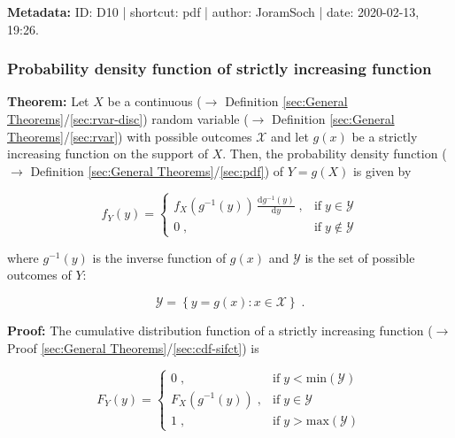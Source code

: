 \documentclass[a4paper,12pt,twoside]{book}
\begin{document}
\vspace{1em}
\textbf{Metadata:} ID: D10 | shortcut: pdf | author: JoramSoch | date: 2020-02-13, 19:26.
\vspace{1em}



\subsubsection[\textbf{Probability density function of strictly increasing function}]{Probability density function of strictly increasing function} \label{sec:pdf-sifct}
\setcounter{equation}{0}

\textbf{Theorem:} Let $X$ be a continuous ($\rightarrow$ Definition \ref{sec:General Theorems}/\ref{sec:rvar-disc}) random variable ($\rightarrow$ Definition \ref{sec:General Theorems}/\ref{sec:rvar}) with possible outcomes $\mathcal{X}$ and let $g(x)$ be a strictly increasing function on the support of $X$. Then, the probability density function ($\rightarrow$ Definition \ref{sec:General Theorems}/\ref{sec:pdf}) of $Y = g(X)$ is given by

\begin{equation} \label{eq:pdf-sifct-pdf-sifct}
f_Y(y) = \left\{
\begin{array}{rl}
f_X(g^{-1}(y)) \, \frac{\mathrm{d}g^{-1}(y)}{\mathrm{d}y} \; , & \text{if} \; y \in \mathcal{Y} \\
0 \; , & \text{if} \; y \notin \mathcal{Y}
\end{array}
\right.
\end{equation}

where $g^{-1}(y)$ is the inverse function of $g(x)$ and $\mathcal{Y}$ is the set of possible outcomes of $Y$:

\begin{equation} \label{eq:pdf-sifct-Y-range}
\mathcal{Y} = \left\lbrace y = g(x): x \in \mathcal{X} \right\rbrace \; .
\end{equation}


\vspace{1em}
\textbf{Proof:} The cumulative distribution function of a strictly increasing function ($\rightarrow$ Proof \ref{sec:General Theorems}/\ref{sec:cdf-sifct}) is

\begin{equation} \label{eq:pdf-sifct-cdf-sifct}
F_Y(y) = \left\{
\begin{array}{rl}
0 \; , & \text{if} \; y < \mathrm{min}(\mathcal{Y}) \\
F_X(g^{-1}(y)) \; , & \text{if} \; y \in \mathcal{Y} \\
1 \; , & \text{if} \; y > \mathrm{max}(\mathcal{Y})
\end{array}
\right.
\end{equation}
\end{document}
